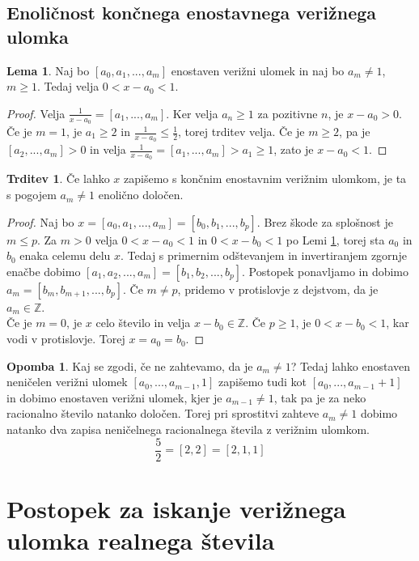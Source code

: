 \documentclass[a4paper,12pt]{article}
\newcommand{\Z}{\mathbb{Z}}
\theoremstyle{definition}
\theoremstyle{proposition}
\newtheorem{trd}{Trditev}[section]
\theoremstyle{theorem}
\theoremstyle{lemma}
\newtheorem{lem}{Lema}[section]
\newtheorem*{op}{Opomba}
\begin{document}
\subsection{Enoličnost končnega enostavnega verižnega ulomka} \label{enolicnost}

\begin{lem}
\label{celidel}
Naj bo $[a_0, a_1, ..., a_m]$ enostaven verižni ulomek in naj bo $a_m \neq 1$, $m \geq 1$. Tedaj velja $0<x-a_0<1$.
\end{lem}
\begin{proof}
Velja $\frac{1}{x-a_0} = [a_1, ..., a_m]$. Ker velja $a_n \geq 1$ za pozitivne $n$, je $x-a_0 > 0$. Če je $m=1$, je $a_1 \geq 2$ in $\frac{1}{x-a_0} \leq \frac{1}{2}$, torej trditev velja. Če je $m\geq2$, pa je $ [a_2, ..., a_m] > 0$ in velja $\frac{1}{x-a_0} = [a_1, ..., a_m] > a_1 \geq1$, zato je $x-a_0<1$.
\end{proof}

\begin{trd}
\label{enolicnost}
Če lahko $x$ zapišemo s končnim enostavnim verižnim ulomkom, je ta s pogojem $a_m \neq 1$ enolično določen.
\end{trd}
\begin{proof}
Naj bo $x=[a_0, a_1, ..., a_m]=[b_0, b_1, ..., b_p]$. Brez škode za splošnost je $m\leq p$. Za $m>0$ velja $0<x-a_0<1$ in $0<x-b_0<1$ po Lemi \ref{celidel}, torej sta $a_0$ in $b_0$ enaka celemu delu $x$. Tedaj s primernim odštevanjem in invertiranjem zgornje enačbe dobimo $[a_1, a_2, ..., a_m]=[b_1, b_2, ..., b_p]$. Postopek ponavljamo in dobimo $a_m =[b_m, b_{m+1}, ..., b_p]$. Če $m \neq p$, pridemo v protislovje z dejstvom, da je $a_m \in \Z$. \\
Če je $m=0$, je $x$ celo število in velja $x-b_0 \in \Z$. Če $p\geq1$, je $0<x-b_0<1$, kar vodi v protislovje. Torej $x=a_0=b_0$. 
\end{proof}

\begin{op}
Kaj se zgodi, če ne zahtevamo, da je $a_m \neq 1$? Tedaj lahko enostaven neničelen verižni ulomek $[a_0, ..., a_{m-1}, 1]$ zapišemo tudi kot $[a_0, ..., a_{m-1}+1]$ in dobimo enostaven verižni ulomek, kjer je $a_{m-1}\neq1$, tak pa je za neko racionalno število natanko določen. Torej pri sprostitvi zahteve $a_m\neq 1$ dobimo natanko dva zapisa neničelnega racionalnega števila z verižnim ulomkom. $$\frac{5}{2}=[2,2]=[2,1,1]$$
\end{op}

\section{Postopek za iskanje verižnega ulomka realnega števila} \label{realna}
\end{document}
